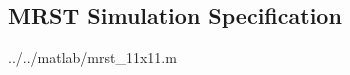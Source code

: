 
\subsection{MRST Simulation Specification} %
\label{sub:mrst_simulation_specification}

  {../../matlab/mrst_11x11.m}
